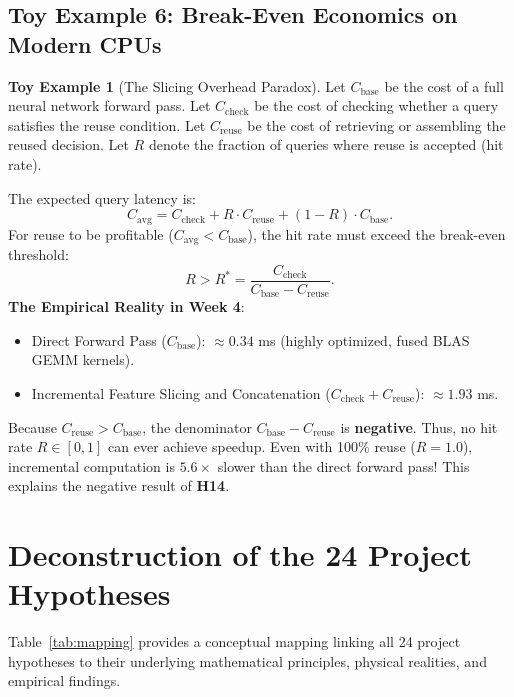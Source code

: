 \documentclass[11pt,article]{article}
\theoremstyle{definition}
\newtheorem{toyexample}{Toy Example}
\begin{document}
\subsection{Toy Example 6: Break-Even Economics on Modern CPUs}
\begin{toyexample}[The Slicing Overhead Paradox]
Let $C_{\text{base}}$ be the cost of a full neural network forward pass.
Let $C_{\text{check}}$ be the cost of checking whether a query satisfies the reuse condition.
Let $C_{\text{reuse}}$ be the cost of retrieving or assembling the reused decision.
Let $R$ denote the fraction of queries where reuse is accepted (hit rate).

The expected query latency is:
\begin{equation}
C_{\text{avg}} = C_{\text{check}} + R \cdot C_{\text{reuse}} + (1 - R) \cdot C_{\text{base}}.
\end{equation}
For reuse to be profitable ($C_{\text{avg}} < C_{\text{base}}$), the hit rate must exceed the break-even threshold:
\begin{equation}
R > R^* = \frac{C_{\text{check}}}{C_{\text{base}} - C_{\text{reuse}}}.
\end{equation}
\textbf{The Empirical Reality in Week 4}:
\begin{itemize}
    \item Direct Forward Pass ($C_{\text{base}}$): $\approx 0.34$ ms (highly optimized, fused BLAS GEMM kernels).
    \item Incremental Feature Slicing and Concatenation ($C_{\text{check}} + C_{\text{reuse}}$): $\approx 1.93$ ms.
\end{itemize}
Because $C_{\text{reuse}} > C_{\text{base}}$, the denominator $C_{\text{base}} - C_{\text{reuse}}$ is \textbf{negative}.
Thus, no hit rate $R \in [0, 1]$ can ever achieve speedup. Even with 100\% reuse ($R=1.0$), incremental computation is $5.6\times$ slower than the direct forward pass! This explains the negative result of \textbf{H14}.
\end{toyexample}

\section{Deconstruction of the 24 Project Hypotheses}

Table~\ref{tab:mapping} provides a conceptual mapping linking all 24 project hypotheses to their underlying mathematical principles, physical realities, and empirical findings.
\end{document}
